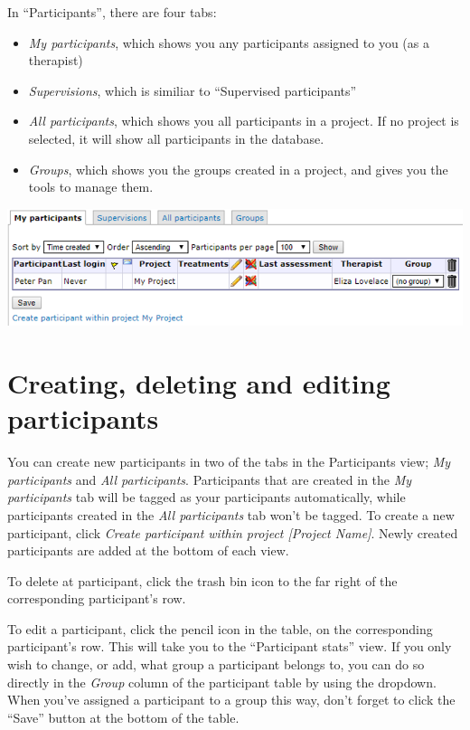 \documentclass[
]{book}
\providecommand{\tightlist}{%
  \setlength{\itemsep}{0pt}\setlength{\parskip}{0pt}}
\begin{document}
In ``Participants'', there are four tabs:

\begin{itemize}
\tightlist
\item
  \emph{My participants}, which shows you any participants assigned to you (as a therapist)
\item
  \emph{Supervisions}, which is similiar to ``Supervised participants''
\item
  \emph{All participants}, which shows you all participants in a project. If no project is selected, it will show all participants in the database.
\item
  \emph{Groups}, which shows you the groups created in a project, and gives you the tools to manage them.
\end{itemize}

\includegraphics{images/new-images/participantsTabs.png}

\section{Creating, deleting and editing participants}\label{creating-deleting-and-editing-participants}

You can create new participants in two of the tabs in the Participants view; \emph{My participants} and \emph{All participants}. Participants that are created in the \emph{My participants} tab will be tagged as your participants automatically, while participants created in the \emph{All participants} tab won't be tagged.
To create a new participant, click \emph{Create participant within project {[}Project Name{]}}. Newly created participants are added at the bottom of each view.

To delete at participant, click the trash bin icon to the far right of the corresponding participant's row.

To edit a participant, click the pencil icon in the table, on the corresponding participant's row. This will take you to the ``Participant stats'' view.
If you only wish to change, or add, what group a participant belongs to, you can do so directly in the \emph{Group} column of the participant table by using the dropdown. When you've assigned a participant to a group this way, don't forget to click the ``Save'' button at the bottom of the table.
\end{document}
